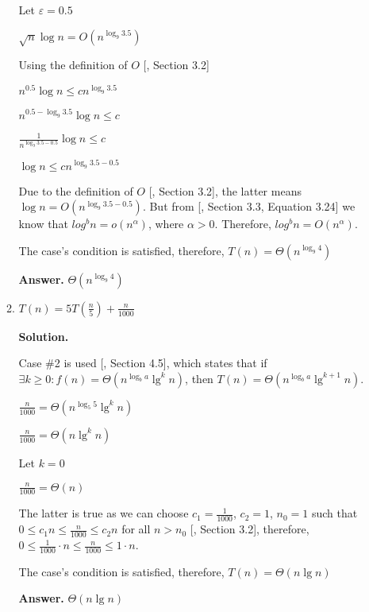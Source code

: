 \documentclass{article}
\begin{document}
\begin{enumerate}
\begin{enumerate}
        Let $\varepsilon = 0.5$

        $\sqrt{n}\log{n} = O(n^{\log_9{3.5}})$
        
        Using the definition of $O$ [, Section 3.2]
        
        $n^{0.5}\log{n} \leq cn^{\log_9{3.5}}$

        $n^{0.5 - \log_9{3.5}}\log{n} \leq c$

        $\frac{1}{n^{\log_9{3.5} - 0.5}}\log{n} \leq c$

        $\log{n} \leq cn^{\log_9{3.5} - 0.5}$

        Due to the definition of $O$ [, Section 3.2], the latter means $\log{n} = O(n^{\log_9{3.5} - 0.5})$. But from [, Section 3.3, Equation 3.24] we know that $log^b{n} = o(n^\alpha)$, where $\alpha > 0$. Therefore, $log^b{n} = O(n^\alpha)$.

        The case's condition is satisfied, therefore, $T(n) = \Theta(n^{\log_9{4}})$
        
        \textbf{Answer.} $\Theta(n^{\log_9{4}})$
        
        \item $T(n) = 5T(\frac{n}{5}) + \frac{n}{1000}$

        \textbf{Solution.}

        Case \#2 is used [, Section 4.5], which states that if $\exists k \geq 0: f(n) = \Theta(n^{\log_b{a}}\lg^k{n})$, then $T(n) = \Theta(n^{\log_b{a}}\lg^{k+1}{n})$.

        $\frac{n}{1000} = \Theta(n^{\log_5{5}}\lg^k{n})$

        $\frac{n}{1000} = \Theta(n\lg^k{n})$

        Let $k = 0$

        $\frac{n}{1000} = \Theta(n)$

        The latter is true as we can choose $c_1 = \frac{1}{1000}$, $c_2 = 1$, $n_0 = 1$ such that $0 \leq c_1 n \leq \frac{n}{1000} \leq c_2 n$ for all $n > n_0$ [, Section 3.2], therefore, $0 \leq \frac{1}{1000} \cdot n \leq \frac{n}{1000} \leq 1 \cdot n$.

        The case's condition is satisfied, therefore, $T(n) = \Theta(n\lg{n})$
        
        \textbf{Answer.} $\Theta(n\lg{n})$
        
    \end{enumerate}
\end{enumerate}
\end{document}
